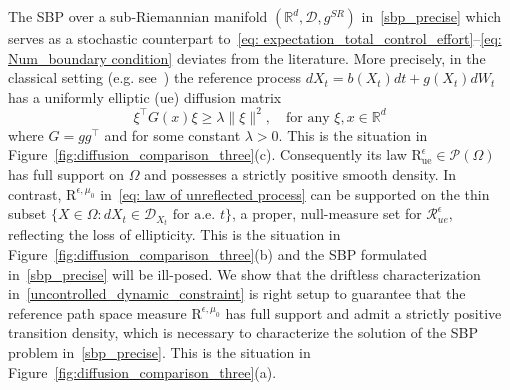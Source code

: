 \documentclass{amsart}
\numberwithin{equation}{section}
\newcommand{\R}{\mathbb{R}}
\begin{document}
The SBP  over a sub-Riemannian manifold $(\R^d,\mathcal{D},g^{SR})$ %
in~\eqref{sbp_precise} which serves as a stochastic counterpart to~\eqref{eq: expectation_total_control_effort}--\eqref{eq: Num_boundary condition} deviates from the literature. More precisely, in the classical setting (e.g. see~\cite{dai1991stochastic}) the reference process $dX_t = b(X_t)dt + g(X_t)dW_t$ has a uniformly elliptic (ue) diffusion matrix 
\[\xi^\top G(x) \xi \ge \lambda \|\xi\|^2, \quad\text{for any $\xi,x\in\R^d$} 
\]
where $G=gg^\top$ and for some constant $\lambda>0$. This is the situation in Figure~\ref{fig:diffusion_comparison_three}(c). Consequently its law $\mathrm{R}_{\mathrm{ue}}^{\epsilon}\in\mathcal P(\Omega)$ has full support on $\Omega$ and possesses a strictly positive smooth density. In contrast, $\mathrm{R}^{\epsilon,\mu_0}$ in~\eqref{eq: law of unreflected process} can be supported on the thin subset $\{X \in \Omega : dX_t \in \mathcal{D}_{X_t} \text{ for a.e. } t\}$, a proper, null-measure set for $\mathcal{R}^{\epsilon}_{ue}$, reflecting the loss of ellipticity. This is the situation in Figure~\ref{fig:diffusion_comparison_three}(b) and the SBP formulated in~\eqref{sbp_precise} will be ill-posed.  We show that the driftless characterization in~\eqref{uncontrolled_dynamic_constraint} is right setup to guarantee that the reference path space measure $\mathrm{R}^{\epsilon,\mu_0}$ has full support and admit a strictly positive transition density, which is necessary to characterize the solution of the SBP problem in~\eqref{sbp_precise}. This is the situation in Figure~\ref{fig:diffusion_comparison_three}(a).
\end{document}

